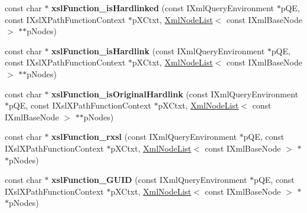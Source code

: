 \begin{DoxyCompactItemize}
\item 
\hypertarget{group__XSLModule-Functions_ga7f6dadf6b17c3131a2231fd473a14fa0}{const char $\ast$ {\bfseries xsl\-Function\-\_\-is\-Hardlinked} (const \-I\-Xml\-Query\-Environment $\ast$p\-Q\-E, const \-I\-Xsl\-X\-Path\-Function\-Context $\ast$p\-X\-Ctxt, \hyperlink{classgeneral__server_1_1XmlNodeList}{\-Xml\-Node\-List}$<$ const \-I\-Xml\-Base\-Node $>$ $\ast$$\ast$p\-Nodes)}\label{group__XSLModule-Functions_ga7f6dadf6b17c3131a2231fd473a14fa0}

\item 
\hypertarget{group__XSLModule-Functions_gab43774d7fa0eb3ac4d798f0454f3de27}{const char $\ast$ {\bfseries xsl\-Function\-\_\-is\-Hardlink} (const \-I\-Xml\-Query\-Environment $\ast$p\-Q\-E, const \-I\-Xsl\-X\-Path\-Function\-Context $\ast$p\-X\-Ctxt, \hyperlink{classgeneral__server_1_1XmlNodeList}{\-Xml\-Node\-List}$<$ const \-I\-Xml\-Base\-Node $>$ $\ast$$\ast$p\-Nodes)}\label{group__XSLModule-Functions_gab43774d7fa0eb3ac4d798f0454f3de27}

\item 
\hypertarget{group__XSLModule-Functions_ga6339a94f68df306fe08789b5cc098a4d}{const char $\ast$ {\bfseries xsl\-Function\-\_\-is\-Original\-Hardlink} (const \-I\-Xml\-Query\-Environment $\ast$p\-Q\-E, const \-I\-Xsl\-X\-Path\-Function\-Context $\ast$p\-X\-Ctxt, \hyperlink{classgeneral__server_1_1XmlNodeList}{\-Xml\-Node\-List}$<$ const \-I\-Xml\-Base\-Node $>$ $\ast$$\ast$p\-Nodes)}\label{group__XSLModule-Functions_ga6339a94f68df306fe08789b5cc098a4d}

\item 
\hypertarget{group__XSLModule-Functions_ga6fec78d2c5935f0a26185cff307e3865}{const char $\ast$ {\bfseries xsl\-Function\-\_\-rxsl} (const \-I\-Xml\-Query\-Environment $\ast$p\-Q\-E, const \-I\-Xsl\-X\-Path\-Function\-Context $\ast$p\-X\-Ctxt, \hyperlink{classgeneral__server_1_1XmlNodeList}{\-Xml\-Node\-List}$<$ const \-I\-Xml\-Base\-Node $>$ $\ast$$\ast$p\-Nodes)}\label{group__XSLModule-Functions_ga6fec78d2c5935f0a26185cff307e3865}

\item 
\hypertarget{group__XSLModule-Functions_ga626c2e3651cab32141d4f1e5abd7234e}{const char $\ast$ {\bfseries xsl\-Function\-\_\-\-G\-U\-I\-D} (const \-I\-Xml\-Query\-Environment $\ast$p\-Q\-E, const \-I\-Xsl\-X\-Path\-Function\-Context $\ast$p\-X\-Ctxt, \hyperlink{classgeneral__server_1_1XmlNodeList}{\-Xml\-Node\-List}$<$ const \-I\-Xml\-Base\-Node $>$ $\ast$$\ast$p\-Nodes)}\label{group__XSLModule-Functions_ga626c2e3651cab32141d4f1e5abd7234e}


\end{DoxyCompactItemize}
